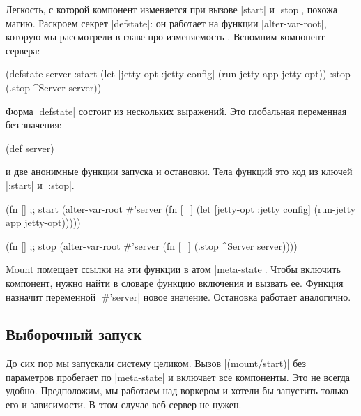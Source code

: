 Легкость, с которой компонент изменяется при вызове \spverb|start| и
\spverb|stop|, похожа магию. Раскроем секрет \spverb|defstate|: он работает на
функции \spverb|alter-var-root|, которую мы рассмотрели в главе про
изменяемость . Вспомним компонент сервера:

\begin{english}
  \begin{clojure}
(defstate server
  :start (let [{jetty-opt :jetty} config]
           (run-jetty app jetty-opt))
  :stop (.stop ^Server server))
  \end{clojure}
\end{english}

Форма \spverb|defstate| состоит из нескольких выражений. Это глобальная
переменная без значения:

\begin{english}
  \begin{clojure}
(def server)
  \end{clojure}
\end{english}

\noindent
и две анонимные функции запуска и остановки. Тела функций это код из ключей
\spverb|:start| и \spverb|:stop|.

\begin{english}
  \begin{clojure}
(fn [] ;; start
  (alter-var-root #'server
   (fn [_]
     (let [{jetty-opt :jetty} config]
       (run-jetty app jetty-opt)))))

(fn [] ;; stop
  (alter-var-root #'server
   (fn [_]
     (.stop ^Server server))))
  \end{clojure}
\end{english}

Mount помещает ссылки на эти функции в атом \spverb|meta-state|. Чтобы включить
компонент, нужно найти в словаре функцию включения и вызвать ее. Функция
назначит переменной \spverb|#'server| новое значение. Остановка работает
аналогично.

\subsection{Выборочный запуск}

До сих пор мы запускали систему целиком. Вызов \spverb|(mount/start)| без
параметров пробегает по \spverb|meta-state| и включает все компоненты. Это не
всегда удобно. Предположим, мы работаем над воркером и хотели бы запустить
только его и зависимости. В этом случае веб-сервер не нужен.

